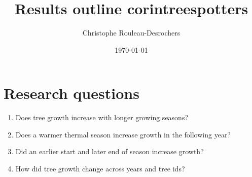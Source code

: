 \documentclass{article}\usepackage[]{graphicx}\usepackage[]{xcolor}
\begin{document}

\title{Results outline corintreespotters}
\author{Christophe Rouleau-Desrochers}
\date{\today}
\maketitle

\newcommand{\Arub}{\textit{A. rubrum}}
\newcommand{\Asac}{\textit{A. saccharum}}
\newcommand{\Afla}{\textit{Ae. flava}}
\newcommand{\Ball}{\textit{B. alleghaniensis}}
\newcommand{\Bnig}{\textit{B. nigra}}
\newcommand{\Cgla}{\textit{C. glabra}}
\newcommand{\Cova}{\textit{C. ovata}}
\newcommand{\Pdel}{\textit{P. deltoides}}
\newcommand{\Qalb}{\textit{Q. alba}}
\newcommand{\Qrub}{\textit{Q. rubra}}
\newcommand{\Tame}{\textit{T. americana}}   




\section*{Research questions}
\begin{enumerate}
\item Does tree growth increase with longer growing seasons?
\item Does a warmer thermal season increase growth in the following year?
\item Did an earlier start and later end of season increase growth? 
\item How did tree growth change across years and tree ids?
\end{enumerate}

\end{document}
